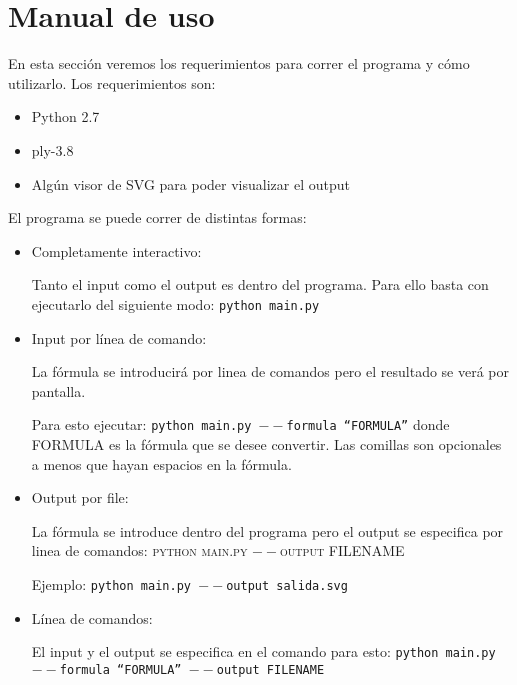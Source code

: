 \section{Manual de uso}
En esta secci\'on veremos los requerimientos para correr el programa y c\'omo utilizarlo. Los requerimientos son:

\begin{itemize}
  \item Python 2.7
  \item ply-3.8
  \item Alg\'un visor de SVG para poder visualizar el output
\end{itemize}

El programa se puede correr de distintas formas:

\begin{itemize}
  \item {
  	\par Completamente interactivo:
  	\par Tanto el input como el output es dentro del programa. Para ello basta con ejecutarlo del siguiente modo: \texttt{python main.py}
  	}
  \item {
  	\par Input por l\'inea de comando:
  	\par La f\'ormula se introducir\'a por linea de comandos pero el resultado se ver\'a por pantalla.
  	\par Para esto ejecutar: \texttt{python main.py $--$formula ``FORMULA''} donde FORMULA es la f\'ormula que se desee convertir. Las comillas son opcionales a menos que hayan espacios en la f\'ormula.
  }
  \item {
  	\par Output por file: 
  	\par La f\'ormula se introduce dentro del programa pero el output se especifica por linea de comandos: \textsc{python main.py $--$output FILENAME} 
  	\par Ejemplo: \texttt{python main.py $--$output salida.svg}
  }
  \item {
  	\par L\'inea de comandos: 
  	\par El input y el output se especifica en el comando para esto: \texttt{python main.py $--$formula ``FORMULA'' $--$output FILENAME}
  }
\end{itemize}
